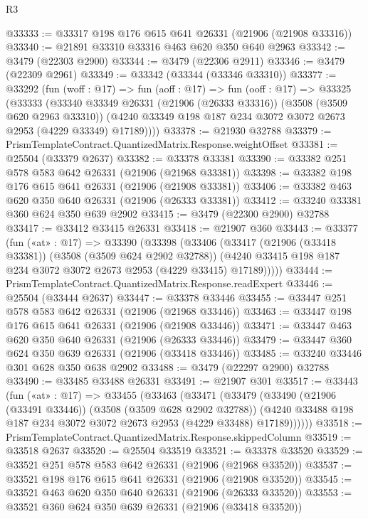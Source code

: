 \begin{lexlean}{R3}
\begin{coremodule}
@33333 := @33317 @198 @176 @615 @641 @26331 (@21906 (@21908 @33316))
@33340 := @21891 @33310 @33316 @463 @620 @350 @640 @2963
@33342 := @3479 (@22303 @2900)
@33344 := @3479 (@22306 @2911)
@33346 := @3479 (@22309 @2961)
@33349 := @33342 (@33344 (@33346 @33310))
@33377 := @33292
    (fun (woff : @17) =>
    fun (aoff : @17) =>
    fun (ooff : @17) =>
    @33325
      (@33333
        (@33340
          @33349
          @26331
          (@21906 (@26333 @33316))
          (@3508 (@3509 @620 @2963 @33310))
          (@4240 @33349 @198 @187 @234 @3072 @3072 @2673 @2953 (@4229 @33349) @17189))))
@33378 := @21930 @32788
@33379 := PrismTemplateContract.QuantizedMatrix.Response.weightOffset
@33381 := @25504 (@33379 @2637)
@33382 := @33378 @33381
@33390 := @33382 @251 @578 @583 @642 @26331 (@21906 (@21968 @33381))
@33398 := @33382 @198 @176 @615 @641 @26331 (@21906 (@21908 @33381))
@33406 := @33382 @463 @620 @350 @640 @26331 (@21906 (@26333 @33381))
@33412 := @33240 @33381 @360 @624 @350 @639 @2902
@33415 := @3479 (@22300 @2900) @32788
@33417 := @33412 @33415 @26331
@33418 := @21907 @360
@33443 := @33377
    (fun («at» : @17) =>
    @33390
      (@33398
        (@33406
          (@33417
            (@21906 (@33418 @33381))
            (@3508 (@3509 @624 @2902 @32788))
            (@4240 @33415 @198 @187 @234 @3072 @3072 @2673 @2953 (@4229 @33415) @17189)))))
@33444 := PrismTemplateContract.QuantizedMatrix.Response.readExpert
@33446 := @25504 (@33444 @2637)
@33447 := @33378 @33446
@33455 := @33447 @251 @578 @583 @642 @26331 (@21906 (@21968 @33446))
@33463 := @33447 @198 @176 @615 @641 @26331 (@21906 (@21908 @33446))
@33471 := @33447 @463 @620 @350 @640 @26331 (@21906 (@26333 @33446))
@33479 := @33447 @360 @624 @350 @639 @26331 (@21906 (@33418 @33446))
@33485 := @33240 @33446 @301 @628 @350 @638 @2902
@33488 := @3479 (@22297 @2900) @32788
@33490 := @33485 @33488 @26331
@33491 := @21907 @301
@33517 := @33443
    (fun («at» : @17) =>
    @33455
      (@33463
        (@33471
          (@33479
            (@33490
              (@21906 (@33491 @33446))
              (@3508 (@3509 @628 @2902 @32788))
              (@4240 @33488 @198 @187 @234 @3072 @3072 @2673 @2953 (@4229 @33488) @17189))))))
@33518 := PrismTemplateContract.QuantizedMatrix.Response.skippedColumn
@33519 := @33518 @2637
@33520 := @25504 @33519
@33521 := @33378 @33520
@33529 := @33521 @251 @578 @583 @642 @26331 (@21906 (@21968 @33520))
@33537 := @33521 @198 @176 @615 @641 @26331 (@21906 (@21908 @33520))
@33545 := @33521 @463 @620 @350 @640 @26331 (@21906 (@26333 @33520))
@33553 := @33521 @360 @624 @350 @639 @26331 (@21906 (@33418 @33520))

\end{coremodule}
\end{lexlean}
